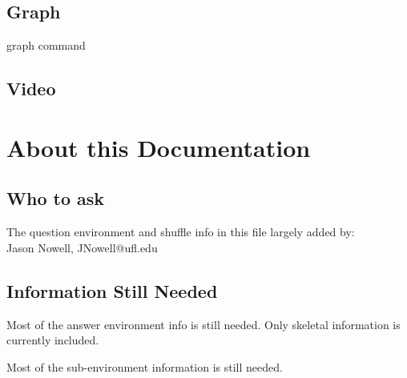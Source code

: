\documentclass{ximera}
\begin{document}
		\subsection{Graph}
			graph command
	
	\subsection{Video}


\newpage
\section{About this Documentation}
	\subsection{Who to ask}
	The question environment and shuffle info in this file largely added by:\\
	Jason Nowell, JNowell@ufl.edu\\
	
	
	\subsection{Information Still Needed}
	Most of the answer environment info is still needed. Only skeletal information is currently included.
	
	Most of the sub-environment information is still needed.
	
\end{document}
